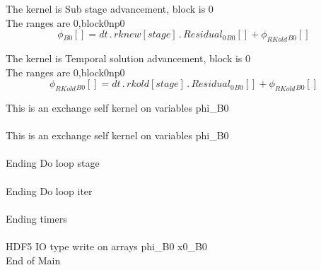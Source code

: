 \documentclass{article}
\begin{document}
\noindent The kernel is Sub stage advancement, block is 0\\\noindent The ranges are 0,block0np0\\\begin{dmath}{\phi{_{B0}}}[{}] = dt \,.\, {rknew}[{stage}] \,.\, {Residual_{0}{_{B0}}}[{}] + {\phi_{RKold}{_{B0}}}[{}]\end{dmath}

\noindent The kernel is Temporal solution advancement, block is 0\\\noindent The ranges are 0,block0np0\\\begin{dmath}{\phi_{RKold}{_{B0}}}[{}] = dt \,.\, {rkold}[{stage}] \,.\, {Residual_{0}{_{B0}}}[{}] + {\phi_{RKold}{_{B0}}}[{}]\end{dmath}

\noindent This is an exchange self kernel on variables phi_B0\\\\\noindent This is an exchange self kernel on variables phi_B0\\\\\noindent Ending Do loop stage\\
\\\noindent Ending Do loop iter\\
\\\noindent Ending timers\\
\\\noindent HDF5 IO type write on arrays phi_B0 x0_B0\\\noindent End of Main\\
\end{document}
